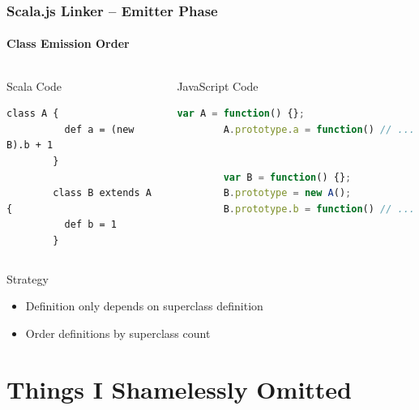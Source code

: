 \documentclass{beamer}
\begin{document}
\begin{frame}[fragile]
  \frametitle{Scala.js Linker -- Emitter Phase}
  \framesubtitle{Class Emission Order}

  \begin{columns}[t]
    \begin{block}{Scala Code\phantom{p}}
      \begin{lstlisting}[gobble=8]
        class A {
          def a = (new B).b + 1
        }

        class B extends A {
          def b = 1
        }
      \end{lstlisting}
    \end{block}

    \pause

    \begin{block}{JavaScript Code}
      \begin{lstlisting}[language=javascript,gobble=8]
        var A = function() {};
        A.prototype.a = function() // ...


        var B = function() {};
        B.prototype = new A();
        B.prototype.b = function() // ...
      \end{lstlisting}
    \end{block}
  \end{columns}

  \pause

  \begin{block}{Strategy}
    \begin{itemize}
    \item Definition only depends on superclass definition
    \pause
    \item Order definitions by superclass count
    \end{itemize}
  \end{block}

\end{frame}



\section*{Things I Shamelessly Omitted}
\end{document}
